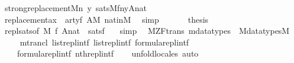 \begin{isabellebody}
\ {\isachardoublequoteopen}strong{\isacharunderscore}{\kern0pt}replacement{\isacharparenleft}{\kern0pt}{\isacharhash}{\kern0pt}{\isacharhash}{\kern0pt}M{\isacharcomma}{\kern0pt}{\isasymlambda}n\ y{\isachardot}{\kern0pt}\ sats{\isacharparenleft}{\kern0pt}M{\isacharcomma}{\kern0pt}{\isacharquery}{\kern0pt}f{\isacharcomma}{\kern0pt}{\isacharbrackleft}{\kern0pt}n{\isacharcomma}{\kern0pt}y{\isacharcomma}{\kern0pt}A{\isacharcomma}{\kern0pt}nat{\isacharbrackright}{\kern0pt}{\isacharparenright}{\kern0pt}{\isacharparenright}{\kern0pt}{\isachardoublequoteclose}\isanewline
\ \ \ \ \isamarkupfalse%
\ replacement{\isacharunderscore}{\kern0pt}ax\ {}\ artyf\ {\isacartoucheopen}A{\isasymin}M{\isacartoucheclose}\ nat{\isacharunderscore}{\kern0pt}in{\isacharunderscore}{\kern0pt}M\ \isamarkupfalse%
\ simp\isanewline
\ \ \isamarkupfalse%
\isanewline
\ \ \isamarkupfalse%
\ {\isacharquery}{\kern0pt}thesis\ \isamarkupfalse%
\ repl{\isacharunderscore}{\kern0pt}sats{\isacharbrackleft}{\kern0pt}of\ M\ {\isacharquery}{\kern0pt}f\ {\isachardoublequoteopen}{\isacharbrackleft}{\kern0pt}A{\isacharcomma}{\kern0pt}nat{\isacharbrackright}{\kern0pt}{\isachardoublequoteclose}{\isacharbrackright}{\kern0pt}\ \ satsf\ \ \isamarkupfalse%
\ simp\isanewline
{}\isamarkupfalse%
%
\endisatagproof
{\isafoldproof}%
%
\isadelimproof
\isanewline
%
\endisadelimproof
\isanewline
{}\isamarkupfalse%
\ {\isacharparenleft}{\kern0pt}\ M{\isacharunderscore}{\kern0pt}ZF{\isacharunderscore}{\kern0pt}trans{\isacharparenright}{\kern0pt}\ mdatatypes\ {\isacharcolon}{\kern0pt}\ {\isachardoublequoteopen}M{\isacharunderscore}{\kern0pt}datatypes{\isacharparenleft}{\kern0pt}{\isacharhash}{\kern0pt}{\isacharhash}{\kern0pt}M{\isacharparenright}{\kern0pt}{\isachardoublequoteclose}\isanewline
%
\isadelimproof
\ \ %
\endisadelimproof
%
\isatagproof
{}\isamarkupfalse%
\ \ mtrancl\ list{\isacharunderscore}{\kern0pt}repl{}{\isacharunderscore}{\kern0pt}intf\ list{\isacharunderscore}{\kern0pt}repl{}{\isacharunderscore}{\kern0pt}intf\ formula{\isacharunderscore}{\kern0pt}repl{}{\isacharunderscore}{\kern0pt}intf\isanewline
\ \ \ \ formula{\isacharunderscore}{\kern0pt}repl{}{\isacharunderscore}{\kern0pt}intf\ nth{\isacharunderscore}{\kern0pt}repl{\isacharunderscore}{\kern0pt}intf\isanewline
\ \ \isamarkupfalse%
\ unfold{\isacharunderscore}{\kern0pt}locales\ auto%
\endisatagproof
{\isafoldproof}%
%
\isadelimproof

\end{isabellebody}
